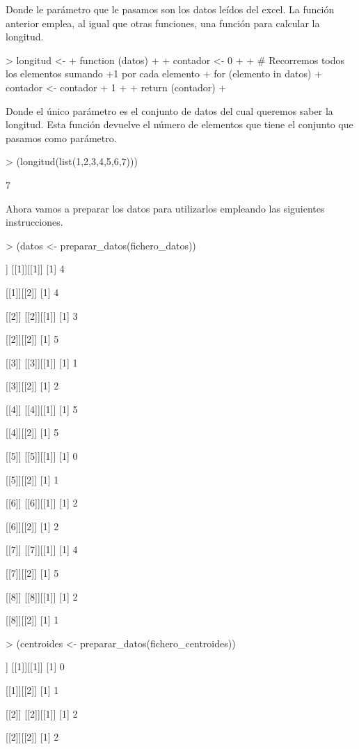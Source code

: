 \documentclass[parskip=full]{scrartcl}
\begin{document}
Donde le parámetro que le pasamos son los datos leídos del excel. La función anterior emplea, al igual que otras funciones, una función para calcular la longitud.


\begin{Schunk}
\begin{Sinput}
> longitud <- 
+   function (datos){
+     
+     contador <- 0
+     
+     # Recorremos todos los elementos sumando +1 por cada elemento
+     for (elemento in datos){
+     contador <- contador + 1
+     }
+     return (contador)
+ }
\end{Sinput}
\end{Schunk}


    Donde el único parámetro es el conjunto de datos del cual queremos saber la longitud. Esta función devuelve el número de elementos que tiene el conjunto que pasamos como parámetro.


\begin{Schunk}
\begin{Sinput}
> (longitud(list(1,2,3,4,5,6,7)))
\end{Sinput}
\begin{Soutput}
[1] 7
\end{Soutput}
\end{Schunk}

   
Ahora vamos a preparar los datos para utilizarlos empleando las siguientes instrucciones.


\begin{Schunk}
\begin{Sinput}
> (datos <- preparar_datos(fichero_datos))
\end{Sinput}
\begin{Soutput}
[[1]]
[[1]][[1]]
[1] 4

[[1]][[2]]
[1] 4


[[2]]
[[2]][[1]]
[1] 3

[[2]][[2]]
[1] 5


[[3]]
[[3]][[1]]
[1] 1

[[3]][[2]]
[1] 2


[[4]]
[[4]][[1]]
[1] 5

[[4]][[2]]
[1] 5


[[5]]
[[5]][[1]]
[1] 0

[[5]][[2]]
[1] 1


[[6]]
[[6]][[1]]
[1] 2

[[6]][[2]]
[1] 2


[[7]]
[[7]][[1]]
[1] 4

[[7]][[2]]
[1] 5


[[8]]
[[8]][[1]]
[1] 2

[[8]][[2]]
[1] 1
\end{Soutput}
\begin{Sinput}
> (centroides <- preparar_datos(fichero_centroides))
\end{Sinput}
\begin{Soutput}
[[1]]
[[1]][[1]]
[1] 0

[[1]][[2]]
[1] 1


[[2]]
[[2]][[1]]
[1] 2

[[2]][[2]]
[1] 2
\end{Soutput}
\end{Schunk}
\end{document}
